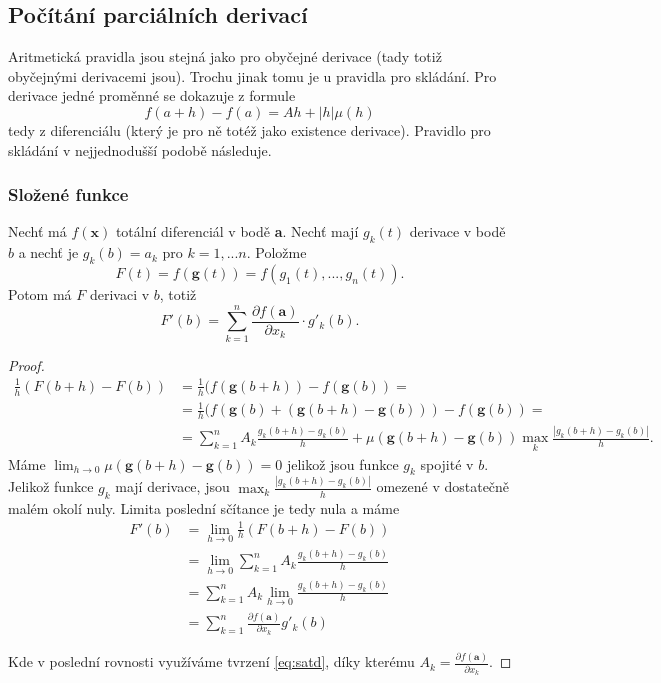 \documentclass[../main.tex]{subfiles}
\begin{document}
\subsection{Počítání parciálních derivací}
Aritmetická pravidla jsou stejná jako pro obyčejné derivace (tady totiž obyčejnými derivacemi jsou).
Trochu jinak tomu je u pravidla pro skládání. Pro derivace jedné proměnné se dokazuje z formule
\[ f(a+h) - f(a) = Ah + |h|\mu (h) \]
tedy z diferenciálu (který je pro ně totéž jako existence derivace).
Pravidlo pro skládání v nejjednodušší podobě následuje.

\subsubsection{Složené funkce}
\begin{theorem}\label{th:dsf}
	Nechť má $f(\textbf{x})$ totální diferenciál v bodě \textbf{a}. Nechť mají $g_k(t)$ derivace v bodě $b$ a nechť je $g_k(b) = a_k$ pro 
	$k = 1,...n.$ Položme
	\[F(t) = f(\textbf{g}(t)) = f(g_1(t),...,g_n(t)).\]
	Potom má $F$ derivaci v $b$, totiž 
	\[F'(b) = \sum^n_{k=1}\frac{\partial f(\textbf{a})}{\partial x_k} \cdot g'_k(b).\]
\end{theorem}

\begin{proof}
	\begin{align*} 
	 \frac{1}{h} (F(b+h) - F(b)) &= \frac{1}{h}(f(\textbf{g}(b+h)) - f(\textbf{g}(b)) =  \\
	 &=\frac{1}{h}(f(\textbf{g}(b) + (\textbf{g}(b+h) - \textbf{g}(b))) - f(\textbf{g}(b)) = \\
	 &=\sum^n_{k=1}A_k\frac{g_k(b+h)-g_k(b)}{h} + \mu(\textbf{g}(b+h) - \textbf{g}(b)) \max_k\frac{|g_k(b+h)-g_k(b)|}{h}.
	\end{align*}
	Máme $\lim_{h \rightarrow 0} \mu(\textbf{g}(b+h)-\textbf{g}(b)) = 0$ jelikož jsou funkce $g_k$ spojité v $b$. 
	Jelikož funkce $g_k$ mají derivace, jsou $\max_k \frac{|g_k(b+h) - g_k(b)|}{h}$ omezené v dostatečně malém okolí nuly. Limita 
	poslední sčítance je tedy nula a máme
	\[
		\begin{aligned}
			F'(b) &= \lim_{h \rightarrow 0} \frac{1}{h}(F(b+h) - F(b)) \\
			&= \lim_{h \rightarrow 0} \sum^n_{k = 1} A_k\frac{g_k(b+h)-g_k(b)}{h} \\
			&= \sum^n_{k = 1}A_k\lim_{h \rightarrow 0} \frac{g_k(b+h) - g_k(b)}{h} \\
			&= \sum^n_{k = 1}\frac{\partial f(\textbf{a})}{\partial x_k}g'_k(b)
		\end{aligned}
	\]

	Kde v poslední rovnosti využíváme tvrzení \ref{eq:satd}, díky kterému $A_k = \frac{\partial f(\textbf{a})}{\partial x_k}$.
\end{proof}
\end{document}
